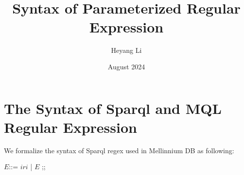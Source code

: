 \documentclass{article}
\title{Syntax of Parameterized Regular Expression}
\author{Heyang Li}
\date{August 2024}
\begin{document}
\maketitle

\section*{The Syntax of Sparql and MQL Regular Expression}
We formalize the syntax of Sparql regex used in Mellinnium DB as following:
\begin{bnfgrammar}
$E$::= $iri$
| $ E$ 
;;
\end{bnfgrammar}
\end{document}
